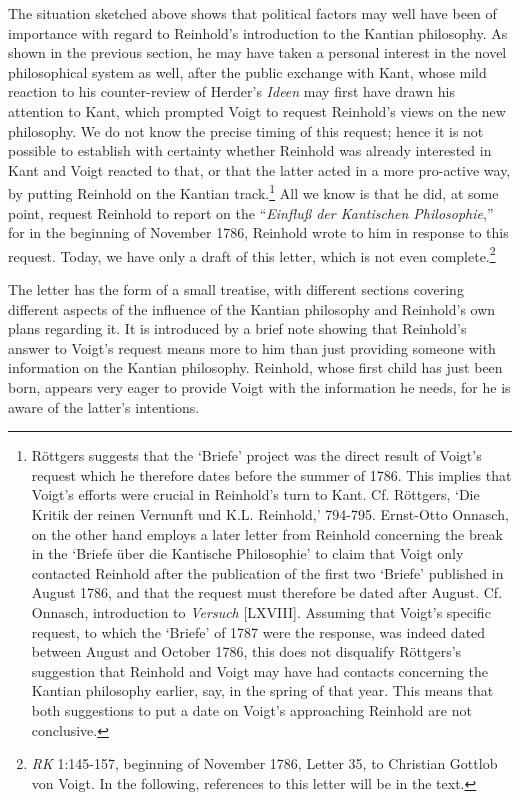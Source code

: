  The situation sketched above shows that political factors may well have been of importance with regard to Reinhold's introduction to the Kantian philosophy. As shown in the previous section, he may have taken a personal interest in the novel philosophical system as well, after the public exchange with Kant, whose mild reaction to his counter{-}review of Herder's \textit{Ideen} may first have drawn his attention to Kant, which prompted Voigt to request Reinhold's views on the new philosophy. We do not know the precise timing of this request; hence it is not possible to establish with certainty whether Reinhold was already interested in Kant and Voigt reacted to that, or that the latter acted in a more pro{-}active way, by putting Reinhold on the Kantian track.\footnote{\label{footnote:_Ref232306650} R\"{o}ttgers suggests that the `Briefe' project was the direct result of Voigt's request which he therefore dates before the summer of 1786. This implies that Voigt's efforts were crucial in Reinhold's turn to Kant. Cf. R\"{o}ttgers, `Die Kritik der reinen Vernunft und K.L. Reinhold,' 794{-}795. Ernst{-}Otto Onnasch, on the other hand employs a later letter from Reinhold concerning the break in the `Briefe \"{u}ber die Kantische Philosophie' to claim that Voigt only contacted Reinhold after the publication of the first two `Briefe' published in August 1786, and that the request must therefore be dated after August. Cf. Onnasch, introduction to \textit{Versuch }[LXVIII]. Assuming that Voigt's specific request, to which the `Briefe' of 1787 were the response, was indeed dated between August and October 1786, this does not disqualify R\"{o}ttgers's suggestion that Reinhold and Voigt may have had contacts concerning the Kantian philosophy earlier, say, in the spring of that year. This means that both suggestions to put a date on Voigt's approaching Reinhold are not conclusive. } All we know is that he did, at some point, request Reinhold to report on the ``\textit{Einflu\ss{} der Kantischen Philosophie},'' for in the beginning of November 1786, Reinhold wrote to him in response to this request. Today, we have only a draft of this letter, which is not even complete.\footnote{ \textit{RK} 1:145{-}157, beginning of November 1786, Letter 35, to Christian Gottlob von Voigt. In the following, references to this letter will be in the text. } 

The letter has the form of a small treatise, with different sections covering different aspects of the influence of the Kantian philosophy and Reinhold's own plans regarding it. It is introduced by a brief note showing that Reinhold's answer to Voigt's request means more to him than just providing someone with information on the Kantian philosophy. Reinhold, whose first child has just been born, appears very eager to provide Voigt with the information he needs, for he is aware of the latter's intentions. 

